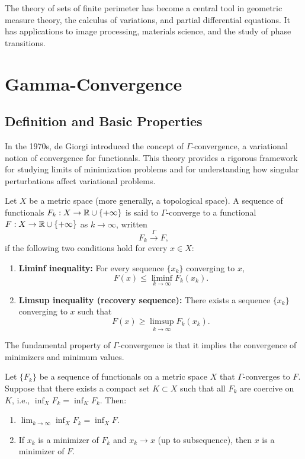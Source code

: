 The theory of sets of finite perimeter has become a central tool in geometric measure theory, the calculus of variations, and partial differential equations. It has applications to image processing, materials science, and the study of phase transitions.

\section{Gamma-Convergence}

\subsection{Definition and Basic Properties}

In the 1970s, de Giorgi introduced the concept of \(\Gamma\)-convergence, a variational notion of convergence for functionals. This theory provides a rigorous framework for studying limits of minimization problems and for understanding how singular perturbations affect variational problems.

\begin{definition}
Let \(X\) be a metric space (more generally, a topological space). A sequence of functionals \(F_k: X \to \mathbb{R} \cup \{+\infty\}\) is said to \(\Gamma\)-converge to a functional \(F: X \to \mathbb{R} \cup \{+\infty\}\) as \(k \to \infty\), written
\[
F_k \xrightarrow{\Gamma} F,
\]
if the following two conditions hold for every \(x \in X\):
\begin{enumerate}
    \item \textbf{Liminf inequality:} For every sequence \(\{x_k\}\) converging to \(x\),
    \[
    F(x) \leq \liminf_{k \to \infty} F_k(x_k).
    \]
    \item \textbf{Limsup inequality (recovery sequence):} There exists a sequence \(\{x_k\}\) converging to \(x\) such that
    \[
    F(x) \geq \limsup_{k \to \infty} F_k(x_k).
    \]
\end{enumerate}
\end{definition}

The fundamental property of \(\Gamma\)-convergence is that it implies the convergence of minimizers and minimum values.

\begin{theorem}
Let \(\{F_k\}\) be a sequence of functionals on a metric space \(X\) that \(\Gamma\)-converges to \(F\). Suppose that there exists a compact set \(K \subset X\) such that all \(F_k\) are coercive on \(K\), i.e., \(\inf_X F_k = \inf_K F_k\). Then:
\begin{enumerate}
    \item \(\lim_{k \to \infty} \inf_X F_k = \inf_X F\).
    \item If \(x_k\) is a minimizer of \(F_k\) and \(x_k \to x\) (up to subsequence), then \(x\) is a minimizer of \(F\).
\end{enumerate}
\end{theorem}

